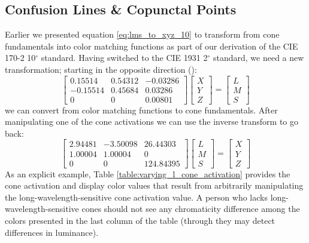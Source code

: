 \documentclass[twocolumn]{article}
\begin{document}
\subsection{Confusion Lines \& Copunctal Points}
Earlier we presented equation \ref{eq:lms_to_xyz_10} to transform from cone fundamentals into color matching functions as part of our derivation of the CIE 170-2 10$^\circ$ standard.  Having switched to the CIE 1931 2$^\circ$ standard, we need a new transformation; starting in the opposite direction (\cite{smith1975spectral}):
\begin{equation}
    \begin{bmatrix}
        0.15514&0.54312&-0.03286\\
        -0.15514&0.45684&0.03286\\
        0&0&0.00801
    \end{bmatrix}\begin{bmatrix}
        X\\
        Y\\
        Z
    \end{bmatrix}=\begin{bmatrix}
        L\\
        M\\
        S
    \end{bmatrix}
\end{equation}
we can convert from color matching functions to cone fundamentals.  After manipulating one of the cone activations we can use the inverse transform to go back:
\begin{equation}
    \begin{bmatrix}
        2.94481&-3.50098&26.44303\\
        1.00004&1.00004&0\\
        0&0&124.84395
    \end{bmatrix}\begin{bmatrix}
        L\\
        M\\
        S
    \end{bmatrix}=\begin{bmatrix}
        X\\
        Y\\
        Z
    \end{bmatrix}
\end{equation}
As an explicit example, Table \ref{table:varying_l_cone_activation} provides the cone activation and display color values that result from arbitrarily manipulating the long-wavelength-sensitive cone activation value.  A person who lacks long-wavelength-sensitive cones should not see any chromaticity difference among the colors presented in the last column of the table (through they may detect differences in luminance).\\
\end{document}
